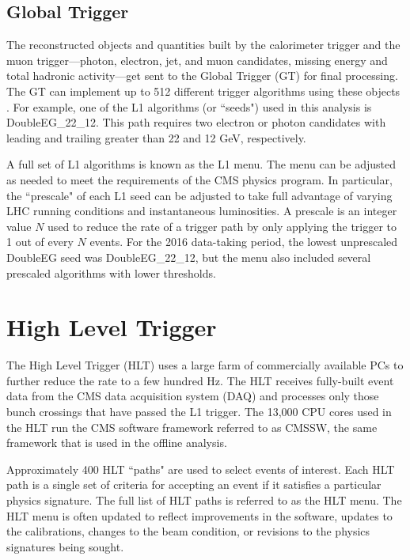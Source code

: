 \subsection{Global Trigger}
The reconstructed objects and quantities built by the calorimeter trigger and the muon trigger---photon, electron, jet, and muon candidates, missing energy and total hadronic activity---get sent to the Global Trigger (GT) for final processing. The GT can implement up to 512 different trigger algorithms using these objects \cite{L1_GT}. For example, one of the L1 algorithms (or ``seeds") used in this analysis is DoubleEG\_22\_12.  This path requires two electron or photon candidates with leading and trailing \pT greater than 22 and 12 GeV, respectively.

A full set of L1 algorithms is known as the L1 menu. The menu can be adjusted as needed to meet the requirements of the CMS physics program. 
In particular, the ``prescale" of each L1 seed can be adjusted 
to take full advantage of varying LHC running conditions and instantaneous luminosities. 
A prescale is an integer value $N$ used to reduce the rate of a trigger path by only applying the trigger to
1 out of every $N$ events. For the 2016 data-taking period, the lowest unprescaled DoubleEG seed was
DoubleEG\_22\_12, but the menu also included several prescaled algorithms with lower \pT thresholds.


\section{High Level Trigger}
\label{HLT}
The High Level Trigger (HLT) uses a large farm of commercially available PCs to further reduce the rate to a few hundred Hz. The HLT receives fully-built event data from the CMS data acquisition system (DAQ) and processes only those bunch crossings that have passed the L1 trigger. The 13,000 CPU cores used in the HLT run the CMS software framework referred to as CMSSW, the same framework that is used in the offline analysis. 

Approximately 400 HLT ``paths" are used to select events of interest. Each HLT path is a single set of criteria for accepting an event if it satisfies a particular physics signature. The full list of HLT paths is referred to as the HLT menu. The HLT menu is often updated to reflect improvements in the software, updates to the calibrations, changes to the beam condition, or revisions to the physics signatures being sought. 

